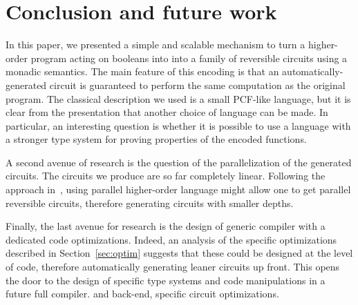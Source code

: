 \documentclass{article}
\theoremstyle{plain}
\theoremstyle{definition}
\begin{document}
\section{Conclusion and future work}
\label{sec:conclusion}
In this paper, we presented a simple and scalable mechanism to turn a
higher-order program acting on booleans into into a family of
reversible circuits using a monadic semantics. The main feature of
this encoding is that an automatically-generated circuit is guaranteed
to perform the same computation as the original program.
The classical description we used is a small PCF-like language, but it
is clear from the presentation that another choice of language can be
made. In particular, an interesting question is whether it is possible
to use a language with a stronger type system for proving
properties of the encoded functions.

A second avenue of research is the question of the parallelization of
the generated circuits. The circuits we produce are so far completely
linear. Following the approach in~\cite{ghica07gos}, using parallel
higher-order language might allow one to get parallel reversible
circuits, therefore generating circuits with smaller depths.

Finally, the last avenue for research is the design of generic
compiler with a dedicated code optimizations.  Indeed, an analysis of
the specific optimizations described in Section~\ref{sec:optim}
suggests that these could be designed at the level of code, therefore
automatically generating leaner circuits up front. This opens the door
to the design of specific type systems and code manipulations in a
future full compiler.  and back-end, specific circuit optimizations.
\end{document}
